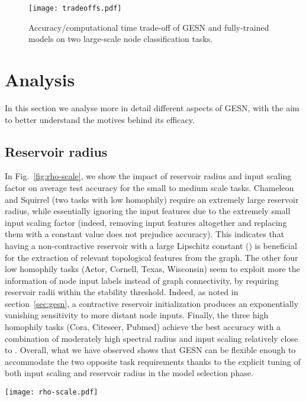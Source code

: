 \documentclass[final,5p,times,twocolumn]{elsarticle}
\begin{document}
\begin{figure}\centering
	\texttt{[image: tradeoffs.pdf]}
	\caption{Accuracy/computational time trade-off of GESN and fully-trained models on two large-scale node classification tasks.}
	\label{fig:efficiencty}
\end{figure}

\section{Analysis}
\label{sec:analysis}

In this section we analyse more in detail different aspects of GESN, with the aim to better understand the motives behind its efficacy.

\subsection{Reservoir radius}

In Fig.~\ref{fig:rho-scale}, we show the impact of reservoir radius  and input scaling factor on average test accuracy for the small to medium scale tasks.
Chameleon and Squirrel (two tasks with low homophily) require an extremely large reservoir radius, while essentially ignoring the input features due to the extremely small input scaling factor (indeed, removing input features altogether and replacing them with a constant value does not prejudice accuracy).
This indicates that having a non-contractive reservoir with a large Lipschitz constant () is beneficial for the extraction of relevant topological features from the graph.
The other four low homophily tasks (Actor, Cornell, Texas, Wisconsin) seem to exploit more the information of node input labels instead of graph connectivity, by requiring reservoir radii within the stability threshold.
Indeed, as noted in section~\ref{sec:gesn}, a contractive reservoir initialization produces an exponentially vanishing sensitivity to more distant node inputs.
Finally, the three high homophily tasks (Cora, Citeseer, Pubmed) achieve the best accuracy with a combination of moderately high spectral radius and input scaling relatively close to .
Overall, what we have observed shows that GESN can be flexible enough to accommodate the two opposite task requirements thanks to the explicit tuning of both input scaling and reservoir radius in the model selection phase.

\begin{figure*}
	\centering
	\texttt{[image: rho-scale.pdf]}
	\caption{Impact of input scaling and reservoir radius on test accuracy (other parameters set by model selection).}
	\label{fig:rho-scale}
\end{figure*}
\end{document}
